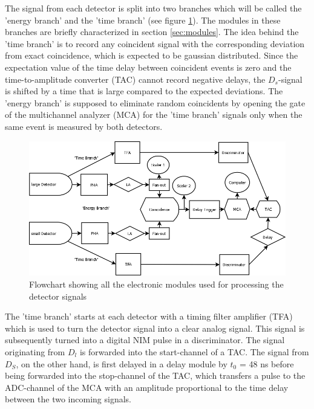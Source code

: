 \documentclass[a4paper,parskip,11pt, DIV12]{scrreprt}
\begin{document}
The signal from each detector is split into two branches which will be called the 'energy branch' and the 'time branch' (see figure \ref{fig:Electronics1}). The modules in these branches are briefly characterized in section \ref{sec:modules}. The idea behind the 'time branch' is to record any coincident signal with the corresponding deviation from exact coincidence, which is expected to be gaussian distributed. Since the expectation value of the time delay between coincident events is zero and the time-to-amplitude converter (TAC) cannot record negative delays, the $D_s$-signal is shifted by a time that is large compared to the expected deviations.  The 'energy branch' is supposed to eliminate random coincidents by opening the gate of the multichannel analyzer (MCA) for the 'time branch' signals only when the same event is measured by both detectors.
\begin{figure}[H]
\centering
\includegraphics[scale=0.21]{KT-Elektronik.png}
\caption[Electronics1]{Flowchart showing all the electronic modules used for processing the detector signals}
\label{fig:Electronics1}
		\end{figure}
The 'time branch' starts at each detector with a timing filter amplifier (TFA) which is used to turn the detector signal into a clear analog signal. This signal is subsequently turned into a digital NIM pulse in a discriminator. The signal originating from $D_l$ is forwarded into the start-channel of a TAC. The signal from $D_S$, on the other hand, is first delayed in a delay module by $t_0$ = 48 ns before being forwarded into the stop-channel of the TAC, which transfers a pulse to the ADC-channel of the MCA with an amplitude proportional to the time delay between the two incoming signals. 
\end{document}
